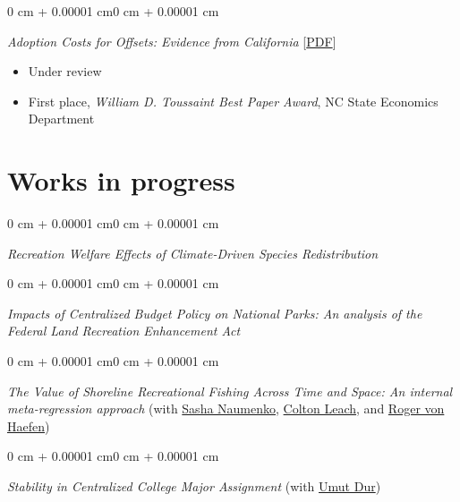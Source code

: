 \documentclass[12pt]{article}
\newenvironment{highlightsforbulletentries}{
	\begin{itemize}[
		topsep=0.10 cm,
		partopsep=0pt,
		leftmargin=20pt,
		]
	\setlength{\parsep}{0.10cm}\setlength{\itemsep}{-2pt}
	}{
	\end{itemize}
}
\newenvironment{onecolentry}{
	\begin{adjustwidth}{0 cm + 0.00001 cm}{0 cm + 0.00001 cm}
	}
	{
	\end{adjustwidth}
}
\newenvironment{paper}{
	\begin{onecolentry}
	\begin{hangingpar}
}{
	\end{hangingpar}
	\end{onecolentry}
	\smallskip
}
\begin{document}
\begin{paper}
	\emph{Adoption Costs for Offsets: Evidence from California} \hfill [\href{https://cenrep.ncsu.edu/publications/transaction-costs-of-emissions-offsets-evidence-from-california/}{PDF}]
	\begin{highlightsforbulletentries}
		\item Under review
		\item First place, \emph{William D. Toussaint Best Paper Award}, NC State Economics Department
	\end{highlightsforbulletentries}
\end{paper}

\section{Works in progress}

\begin{paper}
	\emph{Recreation Welfare Effects of Climate-Driven Species Redistribution}
\end{paper}

\begin{paper}
	\emph{Impacts of Centralized Budget Policy on National Parks: An analysis of the Federal Land Recreation Enhancement Act}
\end{paper}

\begin{paper}
	\emph{The Value of Shoreline Recreational Fishing Across Time and Space: An internal meta-regression approach} (with \href{https://www.linkedin.com/in/avn-econ}{Sasha Naumenko}, \href{https://www.linkedin.com/in/colton-leach-54a080136}{Colton Leach}, and \href{https://rvhaefen.wordpress.ncsu.edu/}{Roger von Haefen})
\end{paper}

\begin{paper}
	\emph{Stability in Centralized College Major Assignment} (with \href{https://sites.google.com/site/umutdur/}{Umut Dur})
\end{paper}

\end{document}
